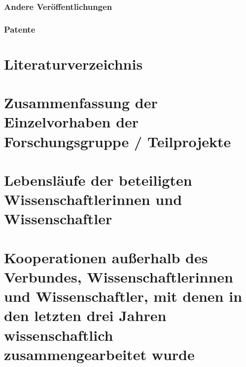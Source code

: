 \documentclass{scrartcl}
\begin{document}
\subsubsection{Andere Veröffentlichungen}
\printbibliography[category=nonreviewed, heading=none]

\subsubsection{Patente}

\printbibliography[category=patents_pending, heading=none]

\printbibliography[category=patents, heading=none]


\section{Literaturverzeichnis}
\printbibliography[notcategory=reviewed, notcategory=nonreviewed, notcategory=patents_pending, notcategory=patents, heading=none]


\section{Zusammenfassung der Einzelvorhaben der Forschungsgruppe / Teilprojekte}


\section{Lebensläufe der beteiligten Wissenschaftlerinnen und Wissenschaftler}


\section{Kooperationen außerhalb des Verbundes, Wissenschaftlerinnen und Wissenschaftler, mit denen in den letzten drei Jahren wissenschaftlich zusammengearbeitet wurde}
\end{document}
